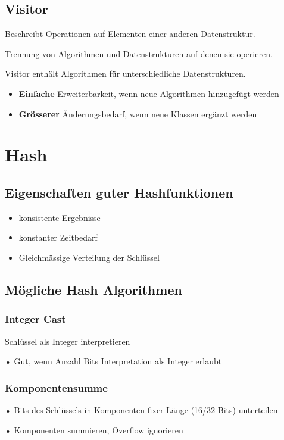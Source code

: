 \begin{multicols*}{4}
	\subsection{Visitor}
	Beschreibt Operationen auf Elementen einer anderen Datenstruktur.
	
	Trennung von Algorithmen und Datenstrukturen auf denen sie operieren. 
	
	Visitor enthält Algorithmen für unterschiedliche Datenstrukturen.
	\begin{itemize}
		\item \textbf{Einfache} Erweiterbarkeit, wenn neue Algorithmen hinzugefügt werden
		\item \textbf{Grösserer} Änderungsbedarf, wenn neue Klassen ergänzt werden
	\end{itemize}

\section{Hash}

	\subsection{Eigenschaften guter Hashfunktionen}
	\begin{itemize}
		\item konsistente Ergebnisse
		\item konstanter Zeitbedarf
		\item Gleichmässige Verteilung der Schlüssel
	\end{itemize}

	\subsection{Mögliche Hash Algorithmen}
		\subsubsection{Integer Cast}
		Schlüssel als Integer interpretieren
		
		• Gut, wenn Anzahl Bits Interpretation als Integer erlaubt
	
		\subsubsection{Komponentensumme}
		• Bits des Schlüssels in Komponenten fixer Länge (16/32 Bits) unterteilen
		
		• Komponenten summieren, Overflow ignorieren
		

\end{multicols*}
